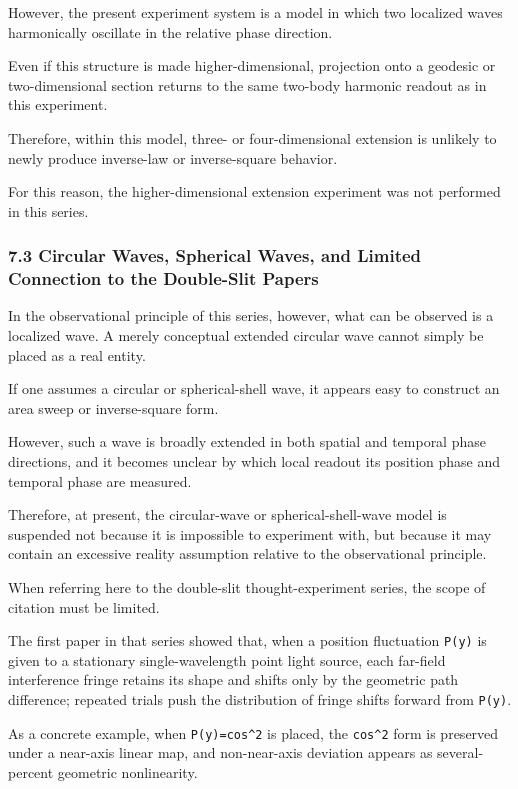 \documentclass[
]{article}
\begin{document}
However, the present experiment system is a model in which two localized
waves harmonically oscillate in the relative phase direction.

Even if this structure is made higher-dimensional, projection onto a
geodesic or two-dimensional section returns to the same two-body
harmonic readout as in this experiment.

Therefore, within this model, three- or four-dimensional extension is
unlikely to newly produce inverse-law or inverse-square behavior.

For this reason, the higher-dimensional extension experiment was not
performed in this series.

\subsubsection{7.3 Circular Waves, Spherical Waves, and Limited
Connection to the Double-Slit
Papers}\label{circular-waves-spherical-waves-and-limited-connection-to-the-double-slit-papers}

In the observational principle of this series, however, what can be
observed is a localized wave. A merely conceptual extended circular wave
cannot simply be placed as a real entity.

If one assumes a circular or spherical-shell wave, it appears easy to
construct an area sweep or inverse-square form.

However, such a wave is broadly extended in both spatial and temporal
phase directions, and it becomes unclear by which local readout its
position phase and temporal phase are measured.

Therefore, at present, the circular-wave or spherical-shell-wave model
is suspended not because it is impossible to experiment with, but
because it may contain an excessive reality assumption relative to the
observational principle.

When referring here to the double-slit thought-experiment series, the
scope of citation must be limited.

The first paper in that series showed that, when a position fluctuation
\texttt{P(y)} is given to a stationary single-wavelength point light
source, each far-field interference fringe retains its shape and shifts
only by the geometric path difference; repeated trials push the
distribution of fringe shifts forward from \texttt{P(y)}.

As a concrete example, when \texttt{P(y)=cos\^{}2} is placed, the
\texttt{cos\^{}2} form is preserved under a near-axis linear map, and
non-near-axis deviation appears as several-percent geometric
nonlinearity.
\end{document}
